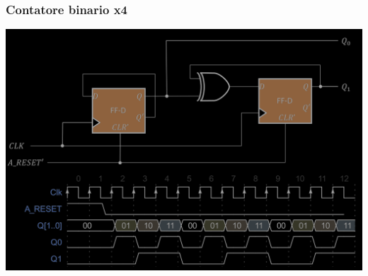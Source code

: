 \documentclass{article}
\begin{document}
\subsubsection*{Contatore binario x4}
\begin{center}
    \includegraphics[scale=0.35]{contatore x4.png}
\end{center}
\end{document}
